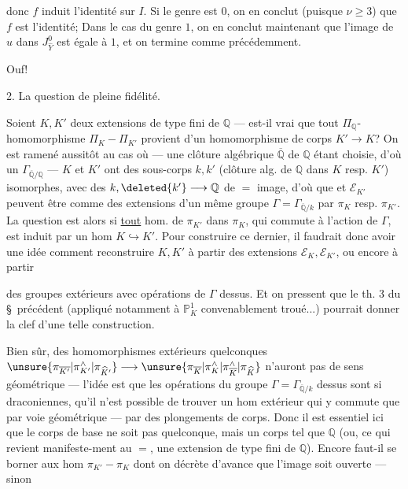 donc $f$ induit l'identité sur $I$. Si le genre est $0$, on en conclut (puisque $\nu\geq3$) que $f$ est l'identité;  Dans le cas du genre $1$, on en conclut maintenant que l'image de $u$ dans $J_{\widehat Y}^0$ est égale à $1$, et on termine comme précédemment.

Ouf!

2. La question de pleine fidélité.

Soient $K,K'$ deux extensions de type fini de $\mathbb Q$ --- est-il vrai que tout $\Pi_{\mathbb Q}$-homomorphisme $\Pi_K-\Pi_{K'}$ provient d'un homomorphisme de corps $K'\longrightarrow K$? On est ramené aussitôt au cas où --- une clôture algébrique $\overline{\mathbb Q}$ de $\mathbb Q$ étant choisie, d'où un $\Gamma_{\overline{\mathbb Q}/\mathbb Q}$ --- $K$ et $K'$ ont des sous-corps $k,k'$ (clôture alg. de $\mathbb Q$ dans $K$ resp. $K'$) isomorphes, avec des   $k,\deleted{k'}\longrightarrow\mathbb Q$ de $=$ image, d'où que  et $\mathcal E_{K'}$ peuvent être  comme des extensions d'un même groupe $\Gamma=\Gamma_{\overline{\mathbb Q}/k}$ par $\pi_K$ resp. $\pi_{K'}$. La question est alors si \uline{tout} hom. de $\pi_{K'}$ dans $\pi_K$, qui commute à l'action de $\Gamma$, est induit par un hom $K\hookrightarrow K'$. Pour construire ce dernier, il faudrait donc avoir une idée comment reconstruire $K,K'$ à partir des extensions $\mathcal E_K,\mathcal E_{K'}$, ou encore à partir

des groupes  extérieurs avec opérations de $\Gamma$ dessus. Et on pressent que le th. 3 du \S\ précédent (appliqué notamment à $\mathbb P_K^1$ convenablement troué...) pourrait donner la clef d'une telle construction.

Bien  sûr, des homomorphismes extérieurs quelconques $\unsure{\pi_{\overline{K'}}|\pi^{\wedge}_{K'}|\pi_{\widehat K'}}\longrightarrow\unsure{\pi_{\overline K}|\pi^{\wedge}_K|\pi^{\wedge}_{\overline K}|\pi_{\widehat K}}$ n'auront pas de sens géométrique --- l'idée est que les opérations du groupe $\Gamma=\Gamma_{\overline{\mathbb Q}/k}$ dessus sont si draconiennes, qu'il n'est possible de trouver un hom extérieur qui y commute que par voie géométrique --- par des plongements de corps. Donc il est essentiel ici que le corps de base ne soit pas quelconque, mais un corps tel que $\mathbb Q$ (ou, ce qui revient manifeste-ment au $=$, une extension de type fini de $\mathbb Q$). Encore faut-il se borner aux hom $\pi_{K'}-\pi_K$ dont on décrète d'avance que l'image soit ouverte --- sinon

